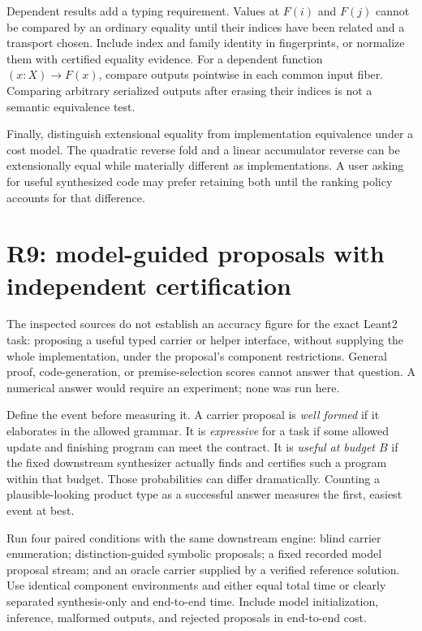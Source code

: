 Dependent results add a typing requirement. Values at $F(i)$ and $F(j)$ cannot be compared by an ordinary equality until their indices have been related and a transport chosen. Include index and family identity in fingerprints, or normalize them with certified equality evidence. For a dependent function $(x:X)\to F(x)$, compare outputs pointwise in each common input fiber. Comparing arbitrary serialized outputs after erasing their indices is not a semantic equivalence test.

Finally, distinguish extensional equality from implementation equivalence under a cost model. The quadratic reverse fold and a linear accumulator reverse can be extensionally equal while materially different as implementations. A user asking for useful synthesized code may prefer retaining both until the ranking policy accounts for that difference.

\section{R9: model-guided proposals with independent certification}
\label{sec:learning}

\ans The inspected sources do not establish an accuracy figure for the exact Leant2 task: proposing a useful typed carrier or helper interface, without supplying the whole implementation, under the proposal's component restrictions. General proof, code-generation, or premise-selection scores cannot answer that question. A numerical answer would require an experiment; none was run here.

Define the event before measuring it. A carrier proposal is \emph{well formed} if it elaborates in the allowed grammar. It is \emph{expressive} for a task if some allowed update and finishing program can meet the contract. It is \emph{useful at budget $B$} if the fixed downstream synthesizer actually finds and certifies such a program within that budget. Those probabilities can differ dramatically. Counting a plausible-looking product type as a successful answer measures the first, easiest event at best.

Run four paired conditions with the same downstream engine: blind carrier enumeration; distinction-guided symbolic proposals; a fixed recorded model proposal stream; and an oracle carrier supplied by a verified reference solution. Use identical component environments and either equal total time or clearly separated synthesis-only and end-to-end time. Include model initialization, inference, malformed outputs, and rejected proposals in end-to-end cost.

